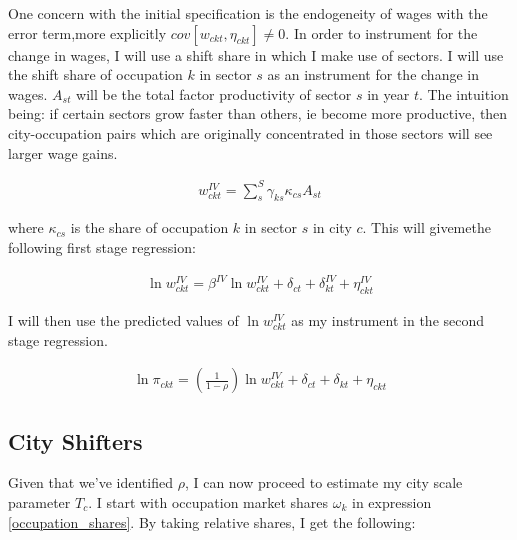 \documentclass[10pt]{article}
\begin{document}

One concern with the initial specification is the endogeneity of wages with the error term,more explicitly $cov[w_{ckt}, \eta_{ckt}] \neq 0$. In order to instrument for the change in wages, I will use a shift share in which I make use of sectors. I will use the shift share of occupation $k$ in sector $s$ as an instrument for the change in wages. $A_{st}$ will be the total factor productivity of sector $s$ in year $t$. The intuition being: if certain sectors grow faster than others, ie become more productive, then city-occupation pairs which are originally concentrated in those sectors will see larger wage gains.


\begin{align*}
    w_{ckt}^{IV} = \sum_{s}^{S} \gamma_{ks} \kappa_{cs} A_{st}
\end{align*}

where $\kappa_{cs}$ is the  share of occupation $k$ in sector $s$ in city $c$. This will givemethe following first stage regression:

\begin{align*}
    \ln w_{ckt}^{IV} = \beta^{IV} \ln w_{ckt}^{IV} + \delta_{ct} + \delta_{kt}^{IV} + \eta_{ckt}^{IV}
\end{align*}

I will then use the predicted values of $\ln w_{ckt}^{IV}$ as my instrument in the second stage regression.

\begin{align*}
    \ln \pi_{ckt} = \left( \frac{1}{1 - \rho} \right) \ln w_{ckt}^{IV} + \delta_{ct} + \delta_{kt} + \eta_{ckt}
\end{align*}

\subsection{City Shifters}

Given that we've identified $\rho$, I can now proceed to estimate my city scale parameter $T_c$. I start with occupation market shares $\omega_k$ in expression \ref{occupation_shares}. By taking relative shares, I get the following:
\end{document}
